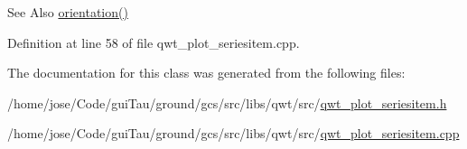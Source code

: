 \begin{DoxySeeAlso}{See Also}
\hyperlink{class_qwt_plot_abstract_series_item_aa51dc15e0845c1674602828a90d75f81}{orientation()} 
\end{DoxySeeAlso}


Definition at line 58 of file qwt\-\_\-plot\-\_\-seriesitem.\-cpp.



The documentation for this class was generated from the following files\-:\begin{DoxyCompactItemize}
\item 
/home/jose/\-Code/gui\-Tau/ground/gcs/src/libs/qwt/src/\hyperlink{qwt__plot__seriesitem_8h}{qwt\-\_\-plot\-\_\-seriesitem.\-h}\item 
/home/jose/\-Code/gui\-Tau/ground/gcs/src/libs/qwt/src/\hyperlink{qwt__plot__seriesitem_8cpp}{qwt\-\_\-plot\-\_\-seriesitem.\-cpp}\end{DoxyCompactItemize}
